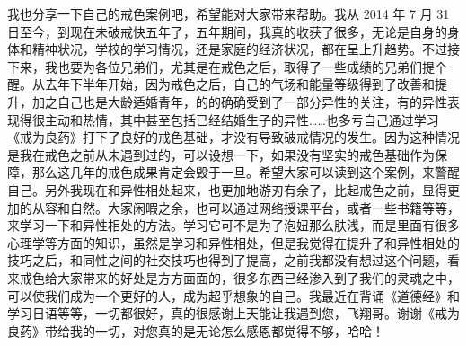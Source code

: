 \begin{case}
    我也分享一下自己的戒色案例吧，希望能对大家带来帮助。我从 2014 年 7 月 31 日至今，到现在未破戒快五年了，五年期间，我真的收获了很多，无论是自身的身体和精神状况，学校的学习情况，还是家庭的经济状况，都在呈上升趋势。不过接下来，我也要为各位兄弟们，尤其是在戒色之后，取得了一些成绩的兄弟们提个醒。从去年下半年开始，因为戒色之后，自己的气场和能量等级得到了改善和提升，加之自己也是大龄适婚青年，的的确确受到了一部分异性的关注，有的异性表现得很主动和热情，其中甚至包括已经结婚生子的异性……也多亏自己通过学习《戒为良药》打下了良好的戒色基础，才没有导致破戒情况的发生。因为这种情况是我在戒色之前从未遇到过的，可以设想一下，如果没有坚实的戒色基础作为保障，那么这几年的戒色成果肯定会毁于一旦。希望大家可以读到这个案例，来警醒自己。另外我现在和异性相处起来，也更加地游刃有余了，比起戒色之前，显得更加的从容和自然。大家闲暇之余，也可以通过网络授课平台，或者一些书籍等等，来学习一下和异性相处的方法。学习它可不是为了泡妞那么肤浅，而是里面有很多心理学等方面的知识，虽然是学习和异性相处，但是我觉得在提升了和异性相处的技巧之后，和同性之间的社交技巧也得到了提高，之前我都没有想过这个问题，看来戒色给大家带来的好处是方方面面的，很多东西已经渗入到了我们的灵魂之中，可以使我们成为一个更好的人，成为超乎想象的自己。我最近在背诵《道德经》和学习日语等等，一切都很好，真的很感谢上天能让我遇到您，飞翔哥。谢谢《戒为良药》带给我的一切，对您真的是无论怎么感恩都觉得不够，哈哈！

\end{case}
